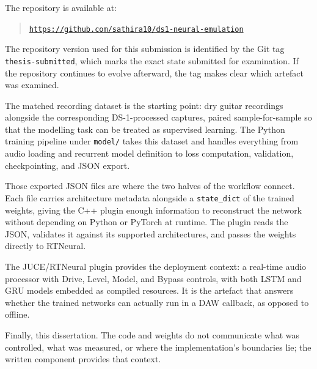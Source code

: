 The repository is available at:
\begin{quote}
  \href{https://github.com/sathira10/ds1-neural-emulation/releases/tag/thesis-submitted}{\texttt{https://github.com/sathira10/ds1-neural-emulation}}
\end{quote}

The repository version used for this submission is identified by the Git tag \texttt{thesis-submitted}, which marks the exact state submitted for examination. If the repository continues to evolve afterward, the tag makes clear which artefact was examined.

The matched recording dataset is the starting point: dry guitar recordings alongside the corresponding DS-1-processed captures, paired sample-for-sample so that the modelling task can be treated as supervised learning. The Python training pipeline under \texttt{model/} takes this dataset and handles everything from audio loading and recurrent model definition to loss computation, validation, checkpointing, and JSON export.

Those exported JSON files are where the two halves of the workflow connect. Each file carries architecture metadata alongside a \texttt{state\_dict} of the trained weights, giving the C++ plugin enough information to reconstruct the network without depending on Python or PyTorch at runtime. The plugin reads the JSON, validates it against its supported architectures, and passes the weights directly to RTNeural.

The JUCE/RTNeural plugin provides the deployment context: a real-time audio processor with Drive, Level, Model, and Bypass controls, with both LSTM and GRU models embedded as compiled resources. It is the artefact that answers whether the trained networks can actually run in a DAW callback, as opposed to offline.

Finally, this dissertation. The code and weights do not communicate what was controlled, what was measured, or where the implementation's boundaries lie; the written component provides that context.

